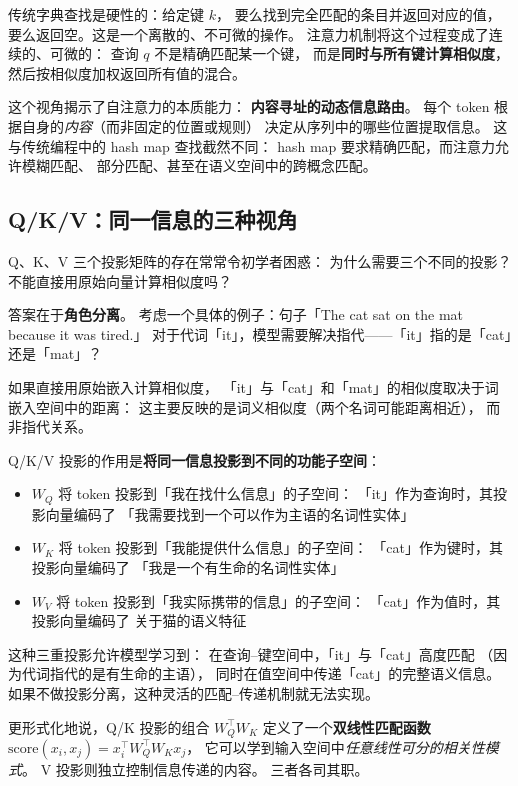 传统字典查找是硬性的：给定键 $k$，
要么找到完全匹配的条目并返回对应的值，
要么返回空。这是一个离散的、不可微的操作。
注意力机制将这个过程变成了连续的、可微的：
查询 $q$ 不是精确匹配某一个键，
而是\textbf{同时与所有键计算相似度}，
然后按相似度加权返回所有值的混合。

这个视角揭示了自注意力的本质能力：
\textbf{内容寻址的动态信息路由}。
每个 token 根据自身的\emph{内容}（而非固定的位置或规则）
决定从序列中的哪些位置提取信息。
这与传统编程中的 hash map 查找截然不同：
hash map 要求精确匹配，而注意力允许模糊匹配、
部分匹配、甚至在语义空间中的跨概念匹配。

\subsection{Q/K/V：同一信息的三种视角}

Q、K、V 三个投影矩阵的存在常常令初学者困惑：
为什么需要三个不同的投影？
不能直接用原始向量计算相似度吗？

答案在于\textbf{角色分离}。
考虑一个具体的例子：句子「The cat sat on the mat because it was tired.」
对于代词「it」，模型需要解决指代——「it」指的是「cat」还是「mat」？

如果直接用原始嵌入计算相似度，
「it」与「cat」和「mat」的相似度取决于词嵌入空间中的距离：
这主要反映的是词义相似度（两个名词可能距离相近），
而非指代关系。

Q/K/V 投影的作用是\textbf{将同一信息投影到不同的功能子空间}：
\begin{itemize}[noitemsep]
  \item $W_Q$ 将 token 投影到「我在找什么信息」的子空间：
        「it」作为查询时，其投影向量编码了
        「我需要找到一个可以作为主语的名词性实体」
  \item $W_K$ 将 token 投影到「我能提供什么信息」的子空间：
        「cat」作为键时，其投影向量编码了
        「我是一个有生命的名词性实体」
  \item $W_V$ 将 token 投影到「我实际携带的信息」的子空间：
        「cat」作为值时，其投影向量编码了
        关于猫的语义特征
\end{itemize}

这种三重投影允许模型学习到：
在查询--键空间中，「it」与「cat」高度匹配
（因为代词指代的是有生命的主语），
同时在值空间中传递「cat」的完整语义信息。
如果不做投影分离，这种灵活的匹配--传递机制就无法实现。

更形式化地说，Q/K 投影的组合 $W_Q^\top W_K$
定义了一个\textbf{双线性匹配函数}
$\mathrm{score}(x_i, x_j) = x_i^\top W_Q^\top W_K x_j$，
它可以学到输入空间中\emph{任意线性可分的相关性模式}。
V 投影则独立控制信息传递的内容。
三者各司其职。


